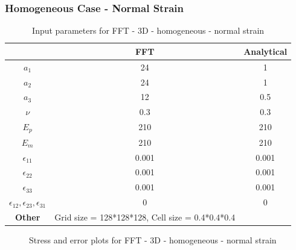 \documentclass[12pt, a4paper]{report}
\begin{document}
\subsubsection{Homogeneous Case - Normal Strain}
\begin{table}[H]
    \centering
    \begin{tabular}{|c|c|c|}
        \hline
        & \textbf{FFT} &\textbf{Analytical}\\
        \hline
        \textbf{$a_1$} & 24 & 1 \\
        \hline
        \textbf{$a_2$} & 24 & 1 \\
        \hline
        \textbf{$a_3$} & 12 & 0.5 \\
        \hline
        \textbf{$\nu$} & 0.3 & 0.3 \\
        \hline
        \textbf{$E_p$} & 210 & 210 \\
        \hline
        \textbf{$E_m$} & 210 & 210 \\
        \hline
        \textbf{$\epsilon_{11}$} & 0.001 & 0.001 \\
        \hline
        \textbf{$\epsilon_{22}$} & 0.001 & 0.001 \\
        \hline
        \textbf{$\epsilon_{33}$} & 0.001 & 0.001 \\
        \hline
        \textbf{$\epsilon_{12}, \epsilon_{23}, \epsilon_{31}$} & 0 & 0 \\
        \hline
        \textbf{Other} & Grid size = 128*128*128, Cell size = 0.4*0.4*0.4 &  \\
        \hline
    \end{tabular}
    \caption{Input parameters for FFT - 3D - homogeneous - normal strain}
\end{table}

\begin{figure}[htbp]
  \centering
  \hfill
  \caption{Stress and error plots for FFT - 3D - homogeneous - normal strain}
\end{figure}
\end{document}
